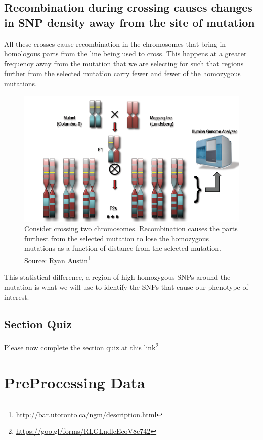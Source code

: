 \documentclass[12pt,]{book}
\let\rmarkdownfootnote\footnote%
\def\footnote{\protect\rmarkdownfootnote}
\renewcommand{\href}[2]{#2\footnote{\url{#1}}}
\begin{document}
\section{Recombination during crossing causes changes in SNP density
away from the site of
mutation}\label{recombination-during-crossing-causes-changes-in-snp-density-away-from-the-site-of-mutation}

All these crosses cause recombination in the chromosomes that bring in
homologous parts from the line being used to cross. This happens at a
greater frequency away from the mutation that we are selecting for such
that regions further from the selected mutation carry fewer and fewer of
the homozygous mutations.






\begin{figure}
\includegraphics[width=4.58in]{assets/ngm} \caption{Consider crossing two chromosomes. Recombination causes
the parts furthest from the selected mutation to lose the homozygous
mutations as a function of distance from the selected mutation. Source:
\href{http://bar.utoronto.ca/ngm/description.html}{Ryan Austin}}\label{fig:ngm}
\end{figure}

This statistical difference, a region of high homozygous SNPs around the
mutation is what we will use to identify the SNPs that cause our
phenotype of interest.

\section{Section Quiz}\label{section-quiz}

Please now complete the section quiz at
\href{https://goo.gl/forms/RLGLndlcEcoV8c742}{this link}

\chapter{PreProcessing Data}\label{preprocessing-data}
\end{document}
